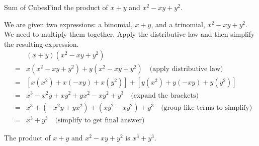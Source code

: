 \documentclass[10pt,a4paper,titlepage,twoside,openright]{report}
\begin{document}
\begin{wex}{Sum of Cubes}{Find the product of $x+y$ and $x^2-xy+y^2$.}{
We are given two expressions: a binomial, $x+y$, and a trinomial, $x^2-xy+y^2$. We need to multiply them together.
Apply the distributive law and then simplify the resulting expression.
\begin{eqnarray*}
&\ &(x+y)(x^2-xy+y^2)\\
&=&x(x^2-xy+y^2) +y(x^2-xy+y^2)\quad\mbox{(apply distributive law)}\\
&=&[x(x^2)+x(-xy)+x(y^2)]+[y(x^2)+y(-xy)+y(y^2)]\\
&=&x^3-x^2y+xy^2+yx^2-xy^2+y^3 \quad\mbox{(expand the brackets)}\\
&=&x^3+ (-x^2y+yx^2)+(xy^2-xy^2)+y^3 \quad\mbox{(group like terms to simplify)}\\
&=&x^3 +y^3 \quad\mbox{(simplify to get final answer)}
\end{eqnarray*}

The product of $x+y$ and $x^2-xy+y^2$ is $x^3 +y^3$.}
\end{wex}


\end{document}
